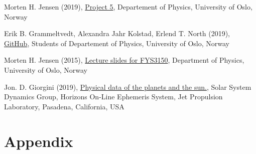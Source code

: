 \documentclass{article}
\begin{document}

\begin{thebibliography}{}

Morten H. Jensen (2019), \href{https://github.com/CompPhysics/ComputationalPhysics/blob/master/doc/Projects/2019/Project5/SolarSystem/pdf/SolarSystem.pdf}{Project 5}, Departement of Physics, University of Oslo, Norway

Erik B. Grammeltvedt, Alexandra Jahr Kolstad, Erlend T. North (2019), \href{https://github.com/Erikbgram/Fys3150}{GitHub}, Students of Departement of Physics, University of Oslo, Norway

Morten H. Jensen (2015), \href{https://github.com/CompPhysics/ComputationalPhysics/blob/master/doc/Lectures/lectures2015.pdf}{Lecture slides for FYS3150}, Department of Physics, University of Oslo, Norway

Jon. D. Giorgini (2019), \href{https://ssd.jpl.nasa.gov/horizons.cgi#top}{Physical data of the planets and the sun.}, Solar System Dynamics Group, Horizons On-Line Ephemeris System, Jet Propulsion Laboratory, Pasadena, California, USA

\end{thebibliography}


\vspace{1cm}


\appendix
\section{Appendix} \label{sec:Appendix}

\end{document}
